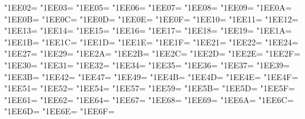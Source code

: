 \XeTeXcharclass"1EE02=\KclassArabU
\XeTeXcharclass"1EE03=\KclassArabU
\XeTeXcharclass"1EE05=\KclassArabU
\XeTeXcharclass"1EE06=\KclassArabU
\XeTeXcharclass"1EE07=\KclassArabU
\XeTeXcharclass"1EE08=\KclassArabU
\XeTeXcharclass"1EE09=\KclassArabU
\XeTeXcharclass"1EE0A=\KclassArabU
\XeTeXcharclass"1EE0B=\KclassArabU
\XeTeXcharclass"1EE0C=\KclassArabU
\XeTeXcharclass"1EE0D=\KclassArabU
\XeTeXcharclass"1EE0E=\KclassArabU
\XeTeXcharclass"1EE0F=\KclassArabU
\XeTeXcharclass"1EE10=\KclassArabU
\XeTeXcharclass"1EE11=\KclassArabU
\XeTeXcharclass"1EE12=\KclassArabU
\XeTeXcharclass"1EE13=\KclassArabU
\XeTeXcharclass"1EE14=\KclassArabU
\XeTeXcharclass"1EE15=\KclassArabU
\XeTeXcharclass"1EE16=\KclassArabU
\XeTeXcharclass"1EE17=\KclassArabU
\XeTeXcharclass"1EE18=\KclassArabU
\XeTeXcharclass"1EE19=\KclassArabU
\XeTeXcharclass"1EE1A=\KclassArabU
\XeTeXcharclass"1EE1B=\KclassArabU
\XeTeXcharclass"1EE1C=\KclassArabU
\XeTeXcharclass"1EE1D=\KclassArabU
\XeTeXcharclass"1EE1E=\KclassArabU
\XeTeXcharclass"1EE1F=\KclassArabU
\XeTeXcharclass"1EE21=\KclassArabU
\XeTeXcharclass"1EE22=\KclassArabU
\XeTeXcharclass"1EE24=\KclassArabU
\XeTeXcharclass"1EE27=\KclassArabU
\XeTeXcharclass"1EE29=\KclassArabU
\XeTeXcharclass"1EE2A=\KclassArabU
\XeTeXcharclass"1EE2B=\KclassArabU
\XeTeXcharclass"1EE2C=\KclassArabU
\XeTeXcharclass"1EE2D=\KclassArabU
\XeTeXcharclass"1EE2E=\KclassArabU
\XeTeXcharclass"1EE2F=\KclassArabU
\XeTeXcharclass"1EE30=\KclassArabU
\XeTeXcharclass"1EE31=\KclassArabU
\XeTeXcharclass"1EE32=\KclassArabU
\XeTeXcharclass"1EE34=\KclassArabU
\XeTeXcharclass"1EE35=\KclassArabU
\XeTeXcharclass"1EE36=\KclassArabU
\XeTeXcharclass"1EE37=\KclassArabU
\XeTeXcharclass"1EE39=\KclassArabU
\XeTeXcharclass"1EE3B=\KclassArabU
\XeTeXcharclass"1EE42=\KclassArabU
\XeTeXcharclass"1EE47=\KclassArabU
\XeTeXcharclass"1EE49=\KclassArabU
\XeTeXcharclass"1EE4B=\KclassArabU
\XeTeXcharclass"1EE4D=\KclassArabU
\XeTeXcharclass"1EE4E=\KclassArabU
\XeTeXcharclass"1EE4F=\KclassArabU
\XeTeXcharclass"1EE51=\KclassArabU
\XeTeXcharclass"1EE52=\KclassArabU
\XeTeXcharclass"1EE54=\KclassArabU
\XeTeXcharclass"1EE57=\KclassArabU
\XeTeXcharclass"1EE59=\KclassArabU
\XeTeXcharclass"1EE5B=\KclassArabU
\XeTeXcharclass"1EE5D=\KclassArabU
\XeTeXcharclass"1EE5F=\KclassArabU
\XeTeXcharclass"1EE61=\KclassArabU
\XeTeXcharclass"1EE62=\KclassArabU
\XeTeXcharclass"1EE64=\KclassArabU
\XeTeXcharclass"1EE67=\KclassArabU
\XeTeXcharclass"1EE68=\KclassArabU
\XeTeXcharclass"1EE69=\KclassArabU
\XeTeXcharclass"1EE6A=\KclassArabU
\XeTeXcharclass"1EE6C=\KclassArabU
\XeTeXcharclass"1EE6D=\KclassArabU
\XeTeXcharclass"1EE6E=\KclassArabU
\XeTeXcharclass"1EE6F=\KclassArabU
